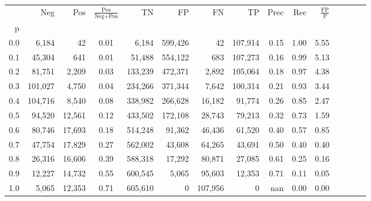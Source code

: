 \begin{tabular}{rrrcrrrrrrrrrrr}
\toprule
{} &      Neg &     Pos & $\frac{\text{Pos}}{\text{Neg}+\text{Pos}}$ &       TN &       FP &       FN &       TP &  Prec &   Rec & $\frac{\text{FP}}{\text{P}}$ \\
p   &          &         &                                            &          &          &          &          &       &       &                              \\
\midrule
0.0 &    6,184 &      42 &                                       0.01 &    6,184 &  599,426 &       42 &  107,914 &  0.15 &  1.00 &                         5.55 \\
0.1 &   45,304 &     641 &                                       0.01 &   51,488 &  554,122 &      683 &  107,273 &  0.16 &  0.99 &                         5.13 \\
0.2 &   81,751 &   2,209 &                                       0.03 &  133,239 &  472,371 &    2,892 &  105,064 &  0.18 &  0.97 &                         4.38 \\
0.3 &  101,027 &   4,750 &                                       0.04 &  234,266 &  371,344 &    7,642 &  100,314 &  0.21 &  0.93 &                         3.44 \\
0.4 &  104,716 &   8,540 &                                       0.08 &  338,982 &  266,628 &   16,182 &   91,774 &  0.26 &  0.85 &                         2.47 \\
0.5 &   94,520 &  12,561 &                                       0.12 &  433,502 &  172,108 &   28,743 &   79,213 &  0.32 &  0.73 &                         1.59 \\
0.6 &   80,746 &  17,693 &                                       0.18 &  514,248 &   91,362 &   46,436 &   61,520 &  0.40 &  0.57 &                         0.85 \\
0.7 &   47,754 &  17,829 &                                       0.27 &  562,002 &   43,608 &   64,265 &   43,691 &  0.50 &  0.40 &                         0.40 \\
0.8 &   26,316 &  16,606 &                                       0.39 &  588,318 &   17,292 &   80,871 &   27,085 &  0.61 &  0.25 &                         0.16 \\
0.9 &   12,227 &  14,732 &                                       0.55 &  600,545 &    5,065 &   95,603 &   12,353 &  0.71 &  0.11 &                         0.05 \\
1.0 &    5,065 &  12,353 &                                       0.71 &  605,610 &        0 &  107,956 &        0 &   nan &  0.00 &                         0.00 \\
\bottomrule
\end{tabular}
